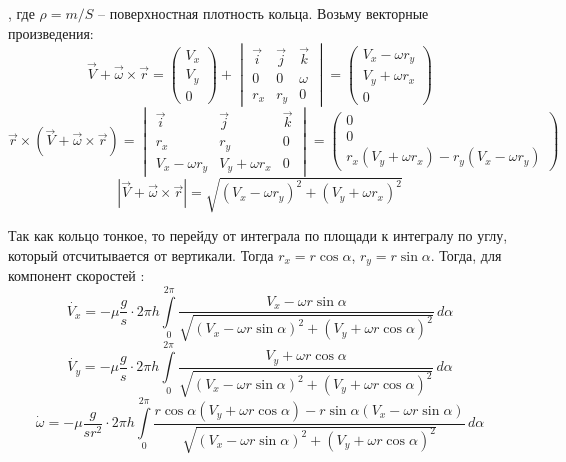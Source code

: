\documentclass[12pt]{report}
\begin{document}
, где $\rho = m / S$ -- поверхностная плотность кольца.
Возьму векторные произведения:
\begin{equation*}
	\vec V + \vec \omega \times \vec r = \begin{pmatrix} V_x \\ V_y \\ 0 \end{pmatrix} + \begin{vmatrix} \vec i & \vec j & \vec k \\ 0 & 0 & \omega \\ r_x & r_y & 0 \end{vmatrix} = \begin{pmatrix} V_x - \omega r_y \\ V_y + \omega r_x \\ 0 \end{pmatrix}
\end{equation*}
\begin{equation*}
	\vec r \times (\vec V + \vec \omega \times \vec r) = \begin{vmatrix} \vec i & \vec j & \vec k \\ r_x & r_y & 0 \\  V_x - \omega r_y & V_y + \omega r_x & 0 \end{vmatrix} = \begin{pmatrix} 0 \\ 0 \\ r_x (V_y + \omega r_x) - r_y(V_x - \omega r_y) \end{pmatrix}
\end{equation*}
\begin{equation*}
	|\vec V +\vec \omega \times \vec r| = \sqrt{(V_x - \omega r_y)^2 + (V_y + \omega r_x)^2}
\end{equation*}


Так как кольцо тонкое, то перейду от интеграла по площади к интегралу по углу, который отсчитывается от вертикали.
Тогда $r_x = r \cos{\alpha}$, $r_y = r \sin{\alpha}$.
Тогда, для компонент скоростей :
\begin{equation}
	\dot{V_x} = - \mu \frac gs \cdot 2 \pi h \int\limits_0^{2 \pi} \frac{V_x - \omega r \sin{\alpha}}{\sqrt{(V_x - \omega r \sin{\alpha})^2 + (V_y+ \omega r \cos{\alpha})^2}} \, d \alpha
	\label{eq1}
\end{equation}
\begin{equation}
	\dot{V_y} = - \mu \frac gs \cdot 2 \pi h \int\limits_0^{2 \pi} \frac{V_y + \omega r \cos{\alpha}}{\sqrt{(V_x - \omega r \sin{\alpha})^2 + (V_y+ \omega r \cos{\alpha})^2}} \, d \alpha
	\label{eq2}
\end{equation}
\begin{equation}
	\dot{\omega} = - \mu \frac g{sr^2} \cdot 2 \pi h \int\limits_0^{2 \pi} \frac{ r \cos{\alpha} (V_y + \omega r \cos{\alpha}) - r \sin{\alpha}(V_x - \omega r \sin{\alpha})}{\sqrt{(V_x - \omega r \sin{\alpha})^2 + (V_y+ \omega r \cos{\alpha})^2}} \, d \alpha
	\label{eq3}
\end{equation}
\end{document}
